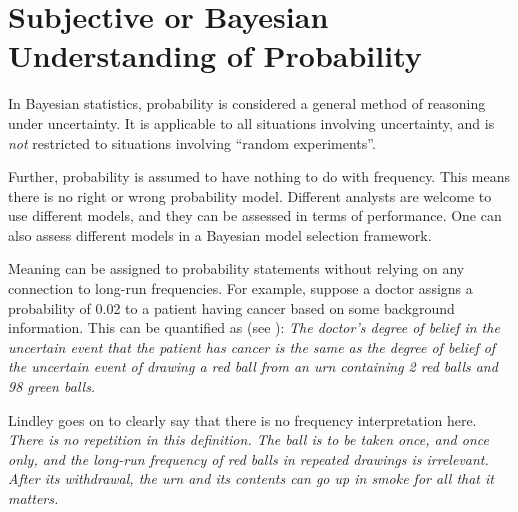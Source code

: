 \documentclass{scrartcl}
\begin{document}
\section{Subjective or Bayesian Understanding of Probability}

In Bayesian statistics, probability is considered a general method of
reasoning under uncertainty. It is applicable to all situations involving 
uncertainty, and is \textit{not} restricted 
to situations involving ``random experiments''.

Further, probability is assumed to have nothing to do with
frequency. This means there is no right or wrong probability
model. Different analysts are welcome to use different models, and
they can be assessed in terms of performance. One can also assess
different models in a Bayesian model selection framework.

Meaning can be assigned to probability statements without relying on
any connection to long-run frequencies. For example, suppose a doctor
assigns a probability of 0.02 to a patient having cancer based on some
background information. This can be quantified as (see \citet[Chapter
3]{Lindley}): \textit{The doctor’s degree of belief
in the uncertain event that the patient has cancer is the same as
the degree of belief of the uncertain event of drawing a red ball
from an urn containing 2 red balls and 98 green balls.}

Lindley goes on to clearly say that there is no frequency
interpretation here. \textit{There is no repetition in this
  definition. The ball is to be 
taken once, and once only, and the long-run frequency of red balls in
repeated drawings is irrelevant. After its withdrawal, the urn and its
contents can go up in smoke for all that it matters.}
\end{document}
